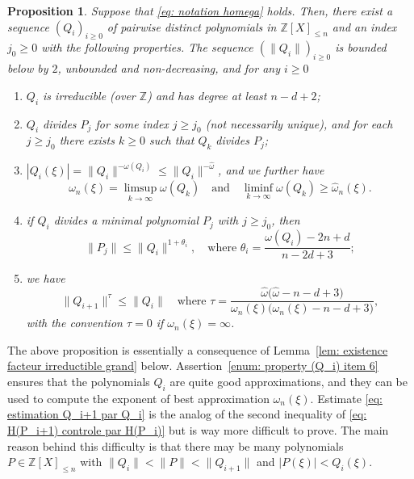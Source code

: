 \documentclass[JEP,XML,SOM,Unicode,NoFloatCountersInSection,published]{cedram}
\newcommand\bZ{\mathbb{Z}}
\newcommand\homega{\widehat{\omega}}\newcommand\HH{\mathcal{H}}
\newcommand{\normH}[1]{\|#1\|}
\newcommand\AND{\quad\text{and}\quad}
\theoremstyle{definition}
\theoremstyle{plain}
\newtheorem{Prop}[Def]{Proposition}
\begin{document}
\begin{Prop}
\label{prop: existence Qi}
Suppose that \eqref{eq: notation homega} holds. Then, there exist a sequence $(Q_i)_{i\geq 0}$ of pairwise distinct polynomials in $\bZ[X]_{\leq n}$ and an index $j_0\geq 0$ with the following properties. The sequence $(\normH{Q_i})_{i\geq 0}$ is bounded below by $2$, unbounded and non-decreasing, and for any $i\geq 0$
\begin{enumerate}
\item \label{enum: property (Q_i) item 1} $Q_i$ is irreducible (over $\bZ$) and has degree at least $n-d+2$;
\item $Q_i$ divides $P_j$ for some index $j\geq j_0$ (not necessarily unique), and for each $j\geq j_0$ there exists $k\geq 0$ such that $Q_k$ divides $P_j$;
\item \label{enum: property (Q_i) item 6} $|Q_i(\xi)| = \normH{Q_i}^{-\omega(Q_i)}\leq \normH{Q_i}^{-\homega}$, and we further have
\begin{equation}
\label{eq: omega_n donné par les Q_i}
\omega_n(\xi) = \limsup_{k\to \infty} \omega(Q_k) \AND \liminf_{k\to \infty} \omega(Q_k) \geq \homega_n(\xi).
\end{equation}
\item \label{enum: H(P_j) controle par H(Q_i)} if $Q_i$ divides a minimal polynomial $P_j$ with $j\geq j_0$, then
\begin{equation}
\label{eq: premiere estimation Pj vs Qi}
\normH{P_j} \leq \normH{Q_i}^{1+\theta_i}, \quad \textrm{where } \theta_i = \frac{\omega(Q_i)-2n+d}{n-2d+3};
\end{equation}
\item \label{enum: H(Q_i+1) controle par H(Q_i)} we have
\begin{equation}
\label{eq: estimation Q_i+1 par Q_i}
\normH{Q_{i+1}}^\tau \leq \normH{Q_i} \quad \textrm{where } \tau = \frac{\homega\big(\homega -n-d+3\big)}{\omega_n(\xi)\big(\omega_n(\xi)-n-d+3\big)},
\end{equation}
with the convention $\tau= 0$ if $\omega_n(\xi) = \infty$.
\end{enumerate}
\end{Prop}

The above proposition is essentially a consequence of Lemma~\ref{lem: existence facteur irreductible grand} below. Assertion~\eqref{enum: property (Q_i) item 6} ensures that the polynomials $Q_i$ are quite good approximations, and they can be used to compute the exponent of best approximation $\omega_n(\xi)$. Estimate \eqref{eq: estimation Q_i+1 par Q_i} is the analog of the second inequality of \eqref{eq: H(P_i+1) controle par H(P_i)} but is way more difficult to prove. The main reason behind this difficulty is that there may be many polynomials $P\in\bZ[X]_{\leq n}$ with $\normH{Q_i} < \normH{P} < \normH{Q_{i+1}}$ and $|P(\xi)| < Q_i(\xi)$.
\end{document}
